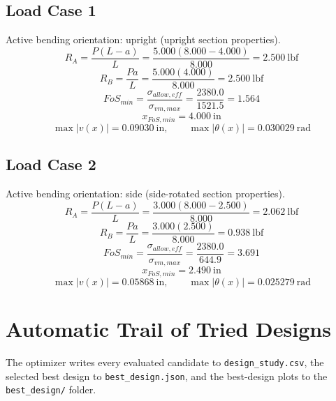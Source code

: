 \documentclass[11pt]{article}
\begin{document}
\subsection*{Load Case 1}
Active bending orientation: upright (upright section properties).
\[R_A = \frac{P(L-a)}{L} = \frac{5.000(8.000-4.000)}{8.000} = 2.500\ \mathrm{lbf}\]
\[R_B = \frac{Pa}{L} = \frac{5.000(4.000)}{8.000} = 2.500\ \mathrm{lbf}\]
\[FoS_{min} = \frac{\sigma_{allow,eff}}{\sigma_{vm,max}} = \frac{2380.0}{1521.5} = 1.564\]
\[x_{FoS,min} = 4.000\ \mathrm{in}\]
\[\max |v(x)| = 0.09030\ \mathrm{in}, \qquad \max |\theta(x)| = 0.030029\ \mathrm{rad}\]
\subsection*{Load Case 2}
Active bending orientation: side (side-rotated section properties).
\[R_A = \frac{P(L-a)}{L} = \frac{3.000(8.000-2.500)}{8.000} = 2.062\ \mathrm{lbf}\]
\[R_B = \frac{Pa}{L} = \frac{3.000(2.500)}{8.000} = 0.938\ \mathrm{lbf}\]
\[FoS_{min} = \frac{\sigma_{allow,eff}}{\sigma_{vm,max}} = \frac{2380.0}{644.9} = 3.691\]
\[x_{FoS,min} = 2.490\ \mathrm{in}\]
\[\max |v(x)| = 0.05868\ \mathrm{in}, \qquad \max |\theta(x)| = 0.025279\ \mathrm{rad}\]

\section*{Automatic Trail of Tried Designs}
The optimizer writes every evaluated candidate to \texttt{design\_study.csv}, the selected best design to \texttt{best\_design.json}, and the best-design plots to the \texttt{best\_design/} folder.
\end{document}

